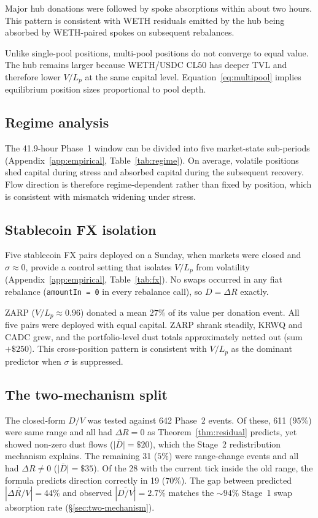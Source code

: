 \documentclass{manuscript}
\begin{document}
Major hub donations were followed by spoke absorptions within about two hours. This pattern is consistent with WETH residuals emitted by the hub being absorbed by WETH-paired spokes on subsequent rebalances.

Unlike single-pool positions, multi-pool positions do not converge to equal value. The hub remains larger because WETH/USDC CL50 has deeper TVL and therefore lower $V/L_p$ at the same capital level. Equation~\eqref{eq:multipool} implies equilibrium position sizes proportional to pool depth.

\subsection{Regime analysis}\label{sec:regime}

The 41.9-hour Phase~1 window can be divided into five market-state sub-periods (Appendix~\ref{app:empirical}, Table~\ref{tab:regime}). On average, volatile positions shed capital during stress and absorbed capital during the subsequent recovery. Flow direction is therefore regime-dependent rather than fixed by position, which is consistent with mismatch widening under stress.

\subsection{Stablecoin FX isolation}\label{sec:fx-isolation}

Five stablecoin FX pairs deployed on a Sunday, when markets were closed and $\sigma \approx 0$, provide a control setting that isolates $V/L_p$ from volatility (Appendix~\ref{app:empirical}, Table~\ref{tab:fx}). No swaps occurred in any fiat rebalance (\texttt{amountIn = 0} in every rebalance call), so $D = \Delta R$ exactly.

ZARP ($V/L_p \approx 0.96$) donated a mean $27\%$ of its value per donation event. All five pairs were deployed with equal capital. ZARP shrank steadily, KRWQ and CADC grew, and the portfolio-level dust totals approximately netted out (sum $+\$250$). This cross-position pattern is consistent with $V/L_p$ as the dominant predictor when $\sigma$ is suppressed.

\subsection{The two-mechanism split}\label{sec:two-mechanism-split}

The closed-form $D/V$ was tested against 642 Phase~2 events. Of these, 611 ($95\%$) were same range and all had $\Delta R = 0$ as Theorem~\ref{thm:residual} predicts, yet showed non-zero dust flows ($\overline{|D|} = \$20$), which the Stage~2 redistribution mechanism explains. The remaining 31 ($5\%$) were range-change events and all had $\Delta R \neq 0$ ($\overline{|D|} = \$35$). Of the 28 with the current tick inside the old range, the formula predicts direction correctly in 19 ($70\%$). The gap between predicted $|\overline{\Delta R/V}| = 44\%$ and observed $|\overline{D/V}| = 2.7\%$ matches the ${\sim}94\%$ Stage~1 swap absorption rate (\S\ref{sec:two-mechanism}).
\end{document}
